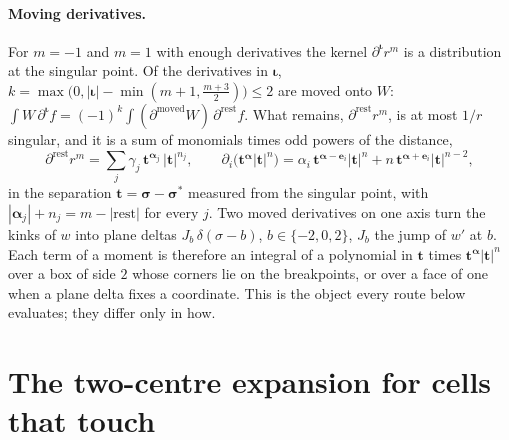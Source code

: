 \documentclass[11pt,a4paper]{article}
\newcommand{\bt}{\mathbf{t}}
\newcommand{\balpha}{\boldsymbol{\alpha}}
\newcommand{\biota}{\boldsymbol{\iota}}
\begin{document}
\paragraph{Moving derivatives.} For $m=-1$ and $m=1$ with enough derivatives the kernel
$\partial^{\biota} r^m$ is a distribution at the singular point. Of the derivatives in $\biota$,
$k=\max\bigl(0,|\biota|-\min(m+1,\tfrac{m+3}{2})\bigr)\le2$ are moved onto $W$:
$\int W\,\partial^{\biota} f=(-1)^k\int(\partial^{\text{moved}}W)\,\partial^{\text{rest}}f$. What remains,
$\partial^{\text{rest}}r^m$, is at most $1/r$ singular, and it is a sum of monomials times odd powers of
the distance,
\begin{equation}\label{eq:monomials}
  \partial^{\text{rest}}r^m=\sum_j\gamma_j\,\bt^{\balpha_j}\,|\bt|^{n_j},\qquad
  \partial_i\bigl(\bt^{\balpha}|\bt|^n\bigr)=\alpha_i\,\bt^{\balpha-\mathbf{e}_i}|\bt|^n+n\,\bt^{\balpha+
  \mathbf{e}_i}|\bt|^{n-2},
\end{equation}
in the separation $\bt=\boldsymbol\sigma-\boldsymbol\sigma^*$ measured from the singular point, with
$|\balpha_j|+n_j=m-|\text{rest}|$ for every $j$. Two moved derivatives on one axis turn the kinks of $w$
into plane deltas $J_b\,\delta(\sigma-b)$, $b\in\{-2,0,2\}$, $J_b$ the jump of $w'$ at $b$. Each term of a
moment is therefore an integral of a polynomial in $\bt$ times $\bt^{\balpha}|\bt|^n$ over a box of side $2$
whose corners lie on the breakpoints, or over a face of one when a plane delta fixes a coordinate. This is
the object every route below evaluates; they differ only in how.

\section{The two-centre expansion for cells that touch}\label{sec:twocentre}
\end{document}
